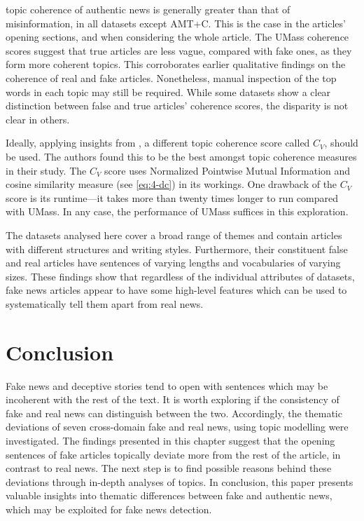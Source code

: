  topic coherence of authentic news is generally greater than that of misinformation, in all datasets except AMT+C. This is the case in the articles' opening sections, and when considering the whole article. The UMass coherence scores suggest that true articles are less vague, compared with fake ones, as they form more coherent topics. This corroborates earlier qualitative findings on the coherence of real and fake articles. Nonetheless, manual inspection of the top words in each topic may still be required. While some datasets show a clear distinction between false and true articles’ coherence scores, the disparity is not clear in others.

Ideally, applying insights from , a different topic coherence score called $C_V$, should be used. The authors found this to be the best amongst topic coherence measures in their study. The $C_V$ score uses Normalized Pointwise Mutual Information and cosine similarity measure (see \autoref{eq:4-dc}) in its workings. One drawback of the $C_V$ score is its runtime—it takes more than twenty times longer to run compared with UMass. In any case, the performance of UMass suffices in this exploration.

The datasets analysed here cover a broad range of themes and contain articles with different structures and writing styles. Furthermore, their constituent false and real articles have sentences of varying lengths and vocabularies of varying sizes. These findings show that regardless of the individual attributes of datasets, fake news articles appear to have some high-level features which can be used to systematically tell them apart from real news.

\section{Conclusion}
\label{sec:4-conclusion}

Fake news and deceptive stories tend to open with sentences which may be incoherent with the rest of the text. It is worth exploring if the consistency of fake and real news can distinguish between the two. Accordingly, the thematic deviations of seven cross-domain fake and real news, using topic modelling were investigated. The findings presented in this chapter suggest that the opening sentences of fake articles topically deviate more from the rest of the article, in contrast to real news. The next step is to find possible reasons behind these deviations through in-depth analyses of topics. In conclusion, this paper presents valuable insights into thematic differences between fake and authentic news, which may be exploited for fake news detection.

